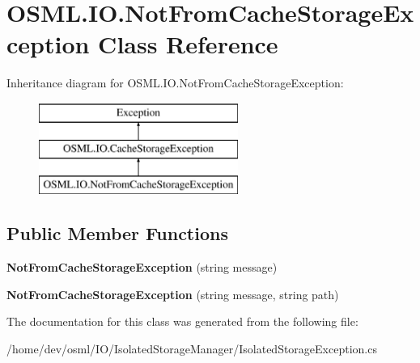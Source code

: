 \hypertarget{classOSML_1_1IO_1_1NotFromCacheStorageException}{}\section{O\+S\+M\+L.\+I\+O.\+Not\+From\+Cache\+Storage\+Exception Class Reference}
\label{classOSML_1_1IO_1_1NotFromCacheStorageException}
Inheritance diagram for O\+S\+M\+L.\+I\+O.\+Not\+From\+Cache\+Storage\+Exception\+:\begin{figure}[H]
\begin{center}
\leavevmode
\includegraphics[height=3.000000cm]{classOSML_1_1IO_1_1NotFromCacheStorageException}
\end{center}
\end{figure}
\subsection*{Public Member Functions}
\begin{DoxyCompactItemize}
\item 
\mbox{\label{classOSML_1_1IO_1_1NotFromCacheStorageException_acf6c8a78c7898f330533b84d3ad7fbd3}} 
{\bfseries Not\+From\+Cache\+Storage\+Exception} (string message)
\item 
\mbox{\label{classOSML_1_1IO_1_1NotFromCacheStorageException_abfe27445c47e0eac5989141ab1acf35f}} 
{\bfseries Not\+From\+Cache\+Storage\+Exception} (string message, string path)
\end{DoxyCompactItemize}


The documentation for this class was generated from the following file\+:\begin{DoxyCompactItemize}
\item 
/home/dev/osml/\+I\+O/\+Isolated\+Storage\+Manager/Isolated\+Storage\+Exception.\+cs\end{DoxyCompactItemize}

